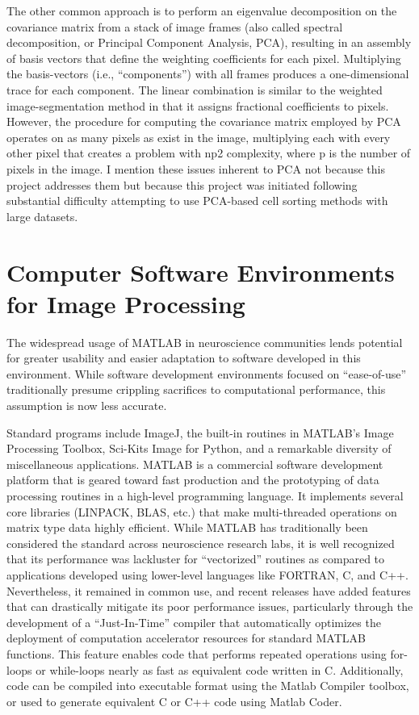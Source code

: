 \documentclass[
  12pt,
]{report}
\numberwithin{figure}{section}
\numberwithin{table}{section}
\numberwithin{equations}{section}
\begin{document}
The other common approach is to perform an eigenvalue decomposition on
the covariance matrix from a stack of image frames (also called spectral
decomposition, or Principal Component Analysis, PCA), resulting in an
assembly of basis vectors that define the weighting coefficients for
each pixel. Multiplying the basis-vectors (i.e., ``components'') with
all frames produces a one-dimensional trace for each component. The
linear combination is similar to the weighted image-segmentation method
in that it assigns fractional coefficients to pixels. However, the
procedure for computing the covariance matrix employed by PCA operates
on as many pixels as exist in the image, multiplying each with every
other pixel that creates a problem with np2 complexity, where p is the
number of pixels in the image. I mention these issues inherent to PCA
not because this project addresses them but because this project was
initiated following substantial difficulty attempting to use PCA-based
cell sorting methods with large datasets.

\hypertarget{computer-software-environments-for-image-processing}{%
\section{Computer Software Environments for Image
Processing}\label{computer-software-environments-for-image-processing}}

The widespread usage of MATLAB in neuroscience communities lends
potential for greater usability and easier adaptation to software
developed in this environment. While software development environments
focused on ``ease-of-use'' traditionally presume crippling sacrifices to
computational performance, this assumption is now less accurate.

Standard programs include ImageJ, the built-in routines in MATLAB's
Image Processing Toolbox, Sci-Kits Image for Python, and a remarkable
diversity of miscellaneous applications. MATLAB is a commercial software
development platform that is geared toward fast production and the
prototyping of data processing routines in a high-level programming
language. It implements several core libraries (LINPACK, BLAS, etc.)
that make multi-threaded operations on matrix type data highly
efficient. While MATLAB has traditionally been considered the standard
across neuroscience research labs, it is well recognized that its
performance was lackluster for ``vectorized'' routines as compared to
applications developed using lower-level languages like FORTRAN, C, and
C++. Nevertheless, it remained in common use, and recent releases have
added features that can drastically mitigate its poor performance
issues, particularly through the development of a ``Just-In-Time''
compiler that automatically optimizes the deployment of computation
accelerator resources for standard MATLAB functions. This feature
enables code that performs repeated operations using for-loops or
while-loops nearly as fast as equivalent code written in C.
Additionally, code can be compiled into executable format using the
Matlab Compiler toolbox, or used to generate equivalent C or C++ code
using Matlab Coder.
\end{document}
